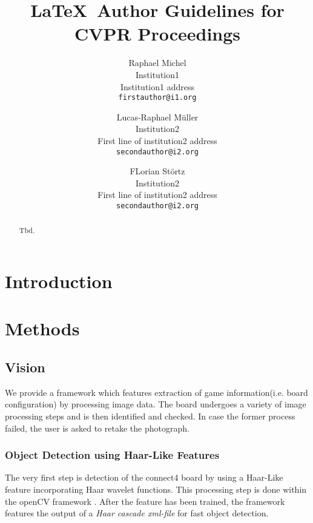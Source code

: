 \documentclass[10pt,twocolumn,letterpaper]{article}
\begin{document}
\title{\LaTeX\ Author Guidelines for CVPR Proceedings}

\author{Raphael Michel\\
Institution1\\
Institution1 address\\
{\tt\small firstauthor@i1.org}
\and
Lucas-Raphael Müller\\
Institution2\\
First line of institution2 address\\
{\tt\small secondauthor@i2.org}
\and
FLorian Störtz\\
Institution2\\
First line of institution2 address\\
{\tt\small secondauthor@i2.org}
}

\maketitle

\begin{abstract}
   Tbd.
\end{abstract}

\section{Introduction}

\section{Methods}

\subsection{Vision}
We provide a framework which features extraction of game information(i.e. board configuration) by processing image data.
The board undergoes a variety of image processing steps and is then identified and checked.
In case the former process failed, the user is asked to retake the photograph.

\subsubsection{Object Detection using Haar-Like Features}
The very first step is detection of the connect4 board by using a Haar-Like feature incorporating Haar wavelet functions.
This processing step is done within the openCV framework \parencite{openCV}.
After the feature has been trained, the framework features the output of a \textit{Haar cascade xml-file} for fast object detection.
\end{document}
